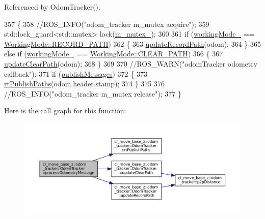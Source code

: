 Referenced by Odom\+Tracker().


\begin{DoxyCode}
357 \{
358     \textcolor{comment}{//ROS\_INFO("odom\_tracker m\_mutex acquire");}
359     std::lock\_guard<std::mutex> lock(\hyperlink{classcl__move__base__z_1_1odom__tracker_1_1OdomTracker_aa371639e1eee269273dec8d3ab9dba0f}{m\_mutex\_});
360 
361     \textcolor{keywordflow}{if} (\hyperlink{classcl__move__base__z_1_1odom__tracker_1_1OdomTracker_a5ae598c85c4469f4c0e984480575c42b}{workingMode\_} == \hyperlink{namespacecl__move__base__z_1_1odom__tracker_ac46b05813b2791604f6cd0a39ace3ef8a023bc3adf68871ef7a0c616765ac80a7}{WorkingMode::RECORD\_PATH})
362     \{
363         \hyperlink{classcl__move__base__z_1_1odom__tracker_1_1OdomTracker_a77a66083573c6bef726d77447fb53349}{updateRecordPath}(odom);
364     \}
365     \textcolor{keywordflow}{else} \textcolor{keywordflow}{if} (\hyperlink{classcl__move__base__z_1_1odom__tracker_1_1OdomTracker_a5ae598c85c4469f4c0e984480575c42b}{workingMode\_} == \hyperlink{namespacecl__move__base__z_1_1odom__tracker_ac46b05813b2791604f6cd0a39ace3ef8a68783989ae56d7f2f9496c66c417a192}{WorkingMode::CLEAR\_PATH})
366     \{
367         \hyperlink{classcl__move__base__z_1_1odom__tracker_1_1OdomTracker_abe7ba4dbf014e1f2c64b5806ce42c073}{updateClearPath}(odom);
368     \}
369 
370     \textcolor{comment}{//ROS\_WARN("odomTracker odometry callback");}
371     \textcolor{keywordflow}{if} (\hyperlink{classcl__move__base__z_1_1odom__tracker_1_1OdomTracker_a4f253d45ab5750dee3c2f18dd5599725}{publishMessages})
372     \{
373         \hyperlink{classcl__move__base__z_1_1odom__tracker_1_1OdomTracker_a8f728f85d1f3f49f4b94e37052a59d6d}{rtPublishPaths}(odom.header.stamp);
374     \}
375 
376     \textcolor{comment}{//ROS\_INFO("odom\_tracker m\_mutex release");}
377 \}
\end{DoxyCode}
Here is the call graph for this function\+:
\nopagebreak
\begin{figure}[H]
\begin{center}
\leavevmode
\includegraphics[width=350pt]{classcl__move__base__z_1_1odom__tracker_1_1OdomTracker_a12c5a839cfde2e8f2f55a5e0c9647b18_cgraph}
\end{center}
\end{figure}
